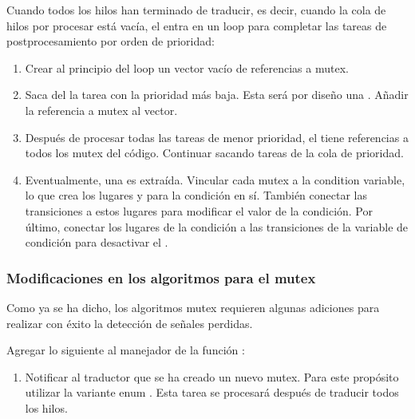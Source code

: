 Cuando todos los hilos han terminado de traducir, es decir, cuando la cola de hilos por procesar
está vacía, el  entra en un loop para completar las tareas de postprocesamiento por
orden de prioridad:

\begin{enumerate}
      \item Crear al principio del loop un vector vacío de referencias a mutex.
      \item Saca del  la tarea con la prioridad más baja.
            Esta será por diseño una .
            Añadir la referencia a mutex al vector.
      \item Después de procesar todas las tareas de menor prioridad,
            el  tiene referencias a
            todos los mutex del código. Continuar sacando tareas de la cola de prioridad.
      \item Eventualmente, una  es extraída.
            Vincular cada mutex a la condition variable,
            lo que crea los lugares 
            y  para la condición en sí.
            También conectar las transiciones 
            a estos lugares para modificar el valor de la condición.
            Por último, conectar los lugares de la condición a las transiciones de la variable de
            condición para desactivar el .
\end{enumerate}

\subsubsection{Modificaciones en los algoritmos para el mutex}

Como ya se ha dicho, los algoritmos mutex requieren algunas adiciones para realizar con éxito
la detección de señales perdidas.

Agregar lo siguiente al manejador de la función :

\begin{enumerate}
      \item Notificar al traductor que se ha creado un nuevo mutex.
            Para este propósito utilizar la variante enum .
            Esta tarea se procesará después de traducir todos los hilos.
\end{enumerate}

